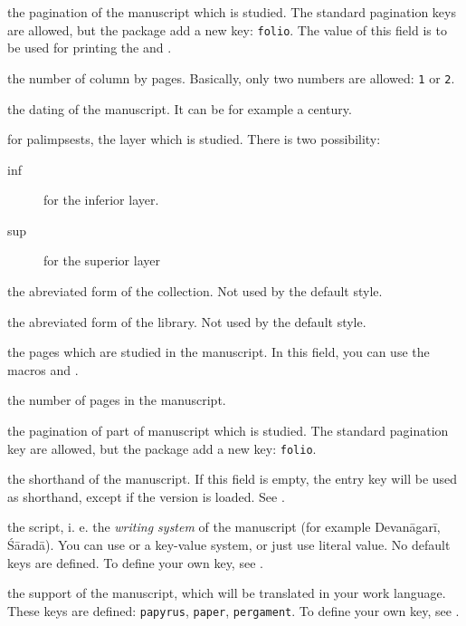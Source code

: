 \documentclass{ltxdockit}[2011/03/25]
\begin{document}
\begin{fieldlist}

 the pagination of the manuscript which is studied. The standard pagination keys are allowed, but the package add a new key: \texttt{folio}. The value of this field is to be used for printing the  and .

 the number of column by pages. Basically, only two numbers are allowed: \verb+1+ or \verb+2+.

 the dating of the manuscript. It can be for example a century.

\label{field:layer} for palimpsests, the layer which is studied. There is two possibility: 
	\begin{description}
		\item[inf] for the inferior layer.
		\item[sup] for the superior layer 
	\end{description}

 the abreviated form of the collection. Not used by the default style.\label{field:shortcollection}


 the abreviated form of the library. Not used by the default style.


 the pages which are studied in the manuscript. In this field, you can use the macros  and .

 the number of pages in the manuscript.


 the pagination of part of manuscript which is studied. The standard pagination key are allowed, but the package add a new key: \verb+folio+.


 the shorthand of the manuscript. If this field is empty, the entry key will be used as shorthand, except if the version  is loaded. See .

 the script, i. e. the \emph{writing system} of the manuscript (for example Devanāgarī, Śāradā).
 You can use or a key-value system, or just use literal value. No default keys are defined.
 To define your own key, see .
 

 the support of the manuscript, which will be translated in your work language. These keys are defined: \texttt{papyrus}, \texttt{paper}, \texttt{pergament}.
 To define your own key, see .
\end{fieldlist}
\end{document}
